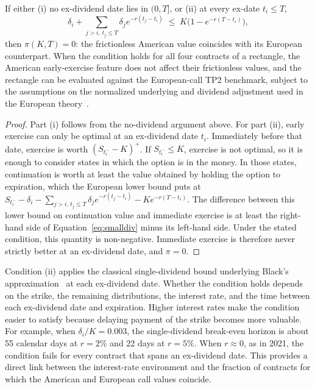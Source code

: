 \documentclass[sigconf,review,anonymous]{acmart}
\begin{document}
\begin{proposition}\label{prop:euro}
If either (i) no ex-dividend date lies in $(0,T]$, or (ii) at every ex-date $t_i\le T$,
\begin{equation}
\textstyle\delta_i+\sum_{j>i,\,t_j\le T}\delta_j e^{-r(t_j-t_i)}\;\le\;K\big(1-e^{-r(T-t_i)}\big),
\label{eq:smalldiv}
\end{equation}
then $\pi(K,T)=0$: the frictionless American value coincides with its European counterpart. When the condition holds for all four contracts of a rectangle, the American early-exercise feature does not affect their frictionless values, and the rectangle can be evaluated against the European-call TP2 benchmark, subject to the assumptions on the normalized underlying and dividend adjustment used in the European theory~\cite{glasserman2026tp2theory}.
\end{proposition}
\begin{proof}
Part (i) follows from the no-dividend argument above. For part (ii), early exercise can only be optimal at an ex-dividend date $t_i$. Immediately before that date, exercise is worth $(S_{t_i^-}-K)^+$. If $S_{t_i^-}\le K$, exercise is not optimal, so it is enough to consider states in which the option is in the money.
In those states, continuation is worth at least the value obtained by holding the option to expiration, which the European lower bound puts at $S_{t_i^-}-\delta_i-\sum_{j>i,\,t_j\le T}\delta_je^{-r(t_j-t_i)}-Ke^{-r(T-t_i)}$. The difference between this lower bound on continuation value and immediate exercise is at least the right-hand side of Equation~\eqref{eq:smalldiv} minus its left-hand side. Under the stated condition, this quantity is non-negative. Immediate exercise is therefore never strictly better at an ex-dividend date, and $\pi=0$.
\end{proof}
\noindent
Condition (ii) applies the classical single-dividend bound underlying Black's approximation~\cite{merton1973,black1975} at each ex-dividend date. Whether the condition holds depends on the strike, the remaining distributions, the interest rate, and the time between each ex-dividend date and expiration. Higher interest rates make the condition easier to satisfy because delaying payment of the strike becomes more valuable. For example, when $\delta_i/K=0.003$, the single-dividend break-even horizon is about 55 calendar days at $r=2\%$ and 22 days at $r=5\%$. When $r\approx0$, as in 2021, the condition fails for every contract that spans an ex-dividend date. This provides a direct link between the interest-rate environment and the fraction of contracts for which the American and European call values coincide.
\end{document}
